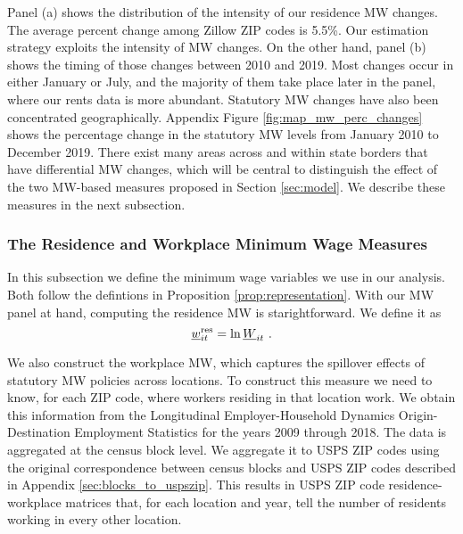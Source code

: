 Panel (a) shows the distribution of the intensity of our residence MW changes. 
The average percent change among Zillow ZIP codes is 5.5\%.
Our estimation strategy exploits the intensity of MW changes.
On the other hand, panel (b) shows the timing of those changes between 2010 and 
2019.
Most changes occur in either January or July, and the majority of them take 
place later in the panel, where our rents data is more abundant.
Statutory MW changes have also been concentrated geographically.
Appendix Figure \ref{fig:map_mw_perc_changes} shows the percentage change 
in the statutory MW levels from January 2010 to December 2019.
There exist many areas across and within state borders that have differential 
MW changes,
which will be central to distinguish the effect of the two MW-based measures
proposed in Section \ref{sec:model}.
We describe these measures in the next subsection. 

\subsubsection*{The Residence and Workplace Minimum Wage Measures}

In this subsection we define the minimum wage variables we use in our analysis.
Both follow the defintions in Proposition \ref{prop:representation}.
With our MW panel at hand, computing the residence MW is starightforward.
We define it as
\begin{equation*}
    \underline{w}^{\text{res}}_{it} = \ln \underline{W}_{it} \ .
\end{equation*}

We also construct the workplace MW, which captures the spillover effects of
statutory MW policies across locations.
To construct this measure we need to know, for each ZIP code, where workers 
residing in that location work.
We obtain this information from the Longitudinal Employer-Household 
Dynamics Origin-Destination Employment Statistics \parencite[LODES;][]{CensusLODES}
for the years 2009 through 2018.
The data is aggregated at the census block level.
We aggregate it to USPS ZIP codes using the original correspondence between 
census blocks and USPS ZIP codes described in Appendix 
\ref{sec:blocks_to_uspszip}.
This results in USPS ZIP code residence-workplace matrices that, for each 
location and year, tell the number of residents working in every other 
location.

